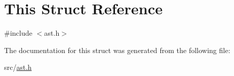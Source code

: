 \hypertarget{struct_this}{}\section{This Struct Reference}
\label{struct_this}


{\ttfamily \#include $<$ast.\+h$>$}



The documentation for this struct was generated from the following file\+:\begin{DoxyCompactItemize}
\item 
src/\hyperlink{ast_8h}{ast.\+h}\end{DoxyCompactItemize}
